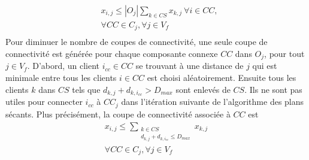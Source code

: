 \documentclass[12pt,a4paper]{article}
\begin{document}
\begin{multicols}{2}
\begin{align*}
&x_{i,j} \leq |O_{j}|\sum_{k \in CS}{x_{k,j}} \ \forall i \in CC, \\ 
&\forall CC \in C_{j}, \forall j \in V_{f}\\ 
\end{align*}
Pour diminuer le nombre de coupes de connectivité, une seule coupe de connectivité est générée pour chaque composante connexe $CC$ dans $O_{j}$, pour tout $j \in V_{f}$. D'abord, un client $i_{cc} \in CC$ se trouvant à une distance de $j$ qui est minimale entre tous les clients $i \in CC$ est choisi aléatoirement. Ensuite tous les clients $k$ dans $CS$ tels que $d_{k,j}+d_{k,i_{cc}}>D_{max}$ sont enlevés de $CS$. Ils ne sont pas utiles pour connecter $i_{cc}$ à $CC_{j}$ dans l'itération suivante de l'algorithme des plans sécants. Plus précisément, la coupe de connectivité associée à $CC$ est
\begin{equation}
\begin{aligned}
x_{i,j} \leq  \sum_{\substack{k \in CS \\d_{k,j}+d_{k,i_{cc}}\leq D_{max}}}{x_{k,j}} \\  
\forall CC \in C_{j}, \forall j \in V_{f}\\ 
\end{aligned}
\end{equation}

\end{multicols}
\end{document}
